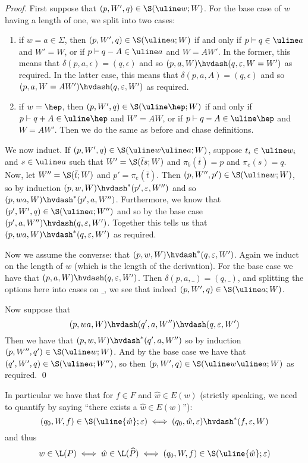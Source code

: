 \documentclass{llncs}
\begin{document}
\begin{proof}

    First suppose that $(p,W',q)\in \S(\uline w;W)$.
    For the base case of $w$ having a length of one, we split into two cases:
    \begin{enumerate}
        \item if $w=a\in\Sigma$, then $(p,W',q)\in \S(\uline a;W)$ if and only if $p\vdash q\in\uline a$ and $W'=W$, or if $p\vdash q- A\in\uline a$ and $W=AW'$.
        In the former, this means that $\delta(p,a,\epsilon)=(q,\epsilon)$ and so $(p,a,W)\hvdash(q,\epsilon,W=W')$ as required.
        In the latter case, this means that $\delta(p,a,A)=(q,\epsilon)$ and so $(p,a,W=AW')\hvdash(q,\epsilon,W')$ as required.
        \item if $w=\hep$, then $(p,W',q)\in \S(\uline\hep;W)$ if and only if $p\vdash q+ A\in\uline\hep$ and $W'=AW$, or if $p\vdash q- A\in\uline\hep$ and $W=AW'$.
        Then we do the same as before and chase definitions.
    \end{enumerate}
    We now induct.
    If $(p,W',q)\in \S(\uline w\uline a;W)$, suppose $t_i\in\uline w_i$ and $s\in\uline a$ such that $W'=\S(\bar ts;W)$ and $\pi_b(\bar t)=p$ and $\pi_e(s)=q$.
    Now, let $W''=\S(\bar t;W)$ and $p'=\pi_e(\bar t)$.
    Then $(p,W'',p')\in \S(\uline w;W)$, so by induction $(p,w,W)\hvdash^*(p',\epsilon,W'')$ and so $(p,wa,W)\hvdash^*(p',a,W'')$.
    Furthermore, we know that $(p',W',q)\in \S(\uline a;W'')$ and so by the base case $(p',a,W'')\hvdash(q,\epsilon,W')$.
    Together this tells us that $(p,wa,W)\hvdash^*(q,\epsilon,W')$ as required.

    Now we assume the converse: that $(p,w,W)\hvdash^*(q,\epsilon,W')$.
    Again we induct on the length of $w$ (which is the length of the derivation).
    For the base case we have that $(p,a,W)\hvdash(q,\epsilon,W')$.
    Then $\delta(p,a,\_)=(q,\_)$, and splitting the options here into cases on $\_$, we see that indeed $(p,W',q)\in \S(\uline a;W)$.

    Now suppose that
    $$ (p,wa,W) \hvdash (q',a,W'') \hvdash (q,\epsilon,W') $$
    Then we have that $(p,w,W)\hvdash^*(q',a,W'')$ so by induction $(p,W'',q')\in \S(\uline w;W)$.
    And by the base case we have that $(q',W',q)\in \S(\uline a;W'')$, so then $(p,W',q)\in \S(\uline w\uline a;W)$ as required.
    \qed

\end{proof}

In particular we have that for $f\in F$ and $\hat w\in E(w)$ (strictly speaking, we need to quantify by saying ``there exists a $\hat w\in E(w)$''):
$$ (q_0,W,f) \in \S(\uline{\hat w};\epsilon) \iff (q_0,\hat w,\epsilon)\hvdash^*(f,\epsilon,W) $$
and thus
$$ w \in \L(P) \iff \hat w \in \L(\widehat P) \iff (q_0,W,f) \in \S(\uline{\hat w};\epsilon) $$
\end{document}
